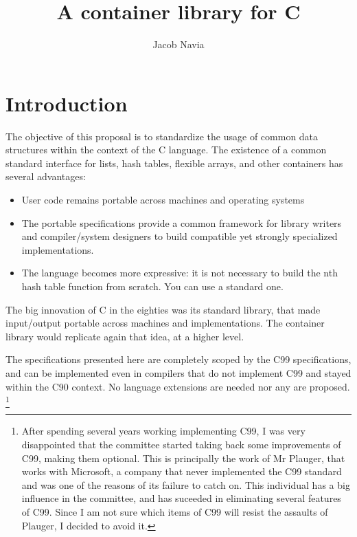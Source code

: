 \documentclass[12pt,a4paper]{memoir} %
\title{A container library for C}
\author{Jacob Navia}
\date{} %
\begin{document}
\setcounter{tocdepth}{5}
\maketitle
\cleardoublepage
\tableofcontents* %
\chapter{Introduction}
The objective of this proposal is to standardize the usage of common data structures within the context of the C language. The existence of a common standard interface for lists, hash tables, flexible arrays, and other containers has several advantages:
\begin{itemize}
\item
User code remains portable across machines and operating systems
\item
The portable specifications provide a common framework for library writers and compiler/system designers to build compatible yet strongly specialized implementations.
\item
The language becomes more expressive: it is not necessary to build the nth hash table function from scratch. You can use a standard one.
\end{itemize}
The big innovation of C in the eighties was its standard library, that made input/output portable across machines and implementations. The container library would replicate again that idea, at a higher level.

The specifications presented here are completely scoped by the C99 specifications, and can be implemented even in compilers that do not implement C99 and stayed within the C90 context. No language extensions are needed nor any are proposed.
\footnote{After spending several years working implementing C99, I was very disappointed that the committee started taking back some improvements of C99, making them optional. This is principally the work of Mr Plauger, that works with Microsoft, a company that never implemented the C99 standard and was one of the reasons of its failure to catch on. This individual has a big influence in the committee, and has suceeded in eliminating several features of C99. Since I am not sure which items of C99 will resist the assaults of Plauger, I decided to avoid it. }
\end{document}
